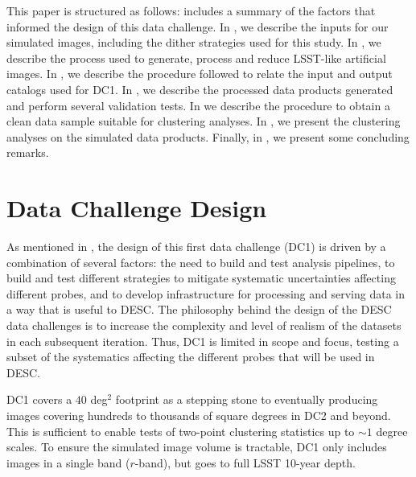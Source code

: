 \documentclass[\docopts]{\docclass}
\begin{document}
This paper is structured as follows:  includes a summary of the factors that informed
the design of this data challenge.  In , we describe the inputs for our simulated images, including the dither strategies used for this study. In , we describe the process used to generate, process and reduce LSST-like artificial images. In , we describe the procedure followed to relate the input and output catalogs used for DC1. In , we describe the processed data products generated and perform several validation tests. In  we describe the procedure to obtain a clean data sample suitable for clustering analyses. In , we present the clustering analyses on the simulated data products. Finally, in , we present some concluding remarks.

\section{Data Challenge Design}
\label{sec:design}

As mentioned in , the design of this first data challenge (DC1) is driven by a
combination of several factors: the need to build and test analysis pipelines, to build and test different strategies to mitigate systematic uncertainties affecting different probes, and to develop infrastructure for processing and serving data in a way that is useful to DESC. The philosophy behind the design of the DESC data challenges is to increase the complexity and level
of realism of the datasets in each subsequent iteration. Thus, DC1 is limited in scope and focus, testing a subset of the systematics affecting the different probes that will be used in DESC.



DC1 covers a $40$ deg$^2$ footprint as a stepping stone to eventually producing images covering hundreds to thousands of square degrees in DC2 and beyond.  This is sufficient to enable tests of
two-point clustering statistics up to $\sim 1$ degree scales.  To ensure the simulated image volume is
tractable, DC1 only includes images in a single band ($r$-band), but goes to full LSST 10-year
depth. 
\end{document}
